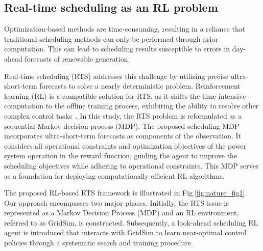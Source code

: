 \subsection*{Real-time scheduling as an RL problem}
Optimization-based methods are time-consuming, resulting in a reliance that traditional scheduling methods can only be performed through prior computation.
This can lead to scheduling results susceptible to errors in day-ahead forecasts of renewable generation. 

Real-time scheduling (RTS) addresses this challenge by utilizing precise ultra-short-term forecasts to solve a nearly deterministic problem. 
Reinforcement learning (RL) is a compatible solution for RTS, as it shifts the time-intensive computation to the offline training process, exhibiting the ability to resolve other complex control tasks~\cite{silver2016mastering,lillicrap2015continuous,schulman2017proximal,degrave2022magnetic,fawzi2022discovering,mandhane2022muzero}.
In this study, the RTS problem is reformulated as a sequential Markov decision process (MDP). 
The proposed scheduling MDP incorporates ultra-short-term forecasts as components of the observation. It considers all operational constraints and optimization objectives of the power system operation in the reward function, guiding the agent to improve the scheduling objectives while adhering to operational constraints. 
This MDP serves as a foundation for deploying computationally efficient RL algorithms.

The proposed RL-based RTS framework is illustrated in Fig.\ref{fig:nature_fig1}. Our approach encompasses two major phases. Initially, the RTS issue is represented as a Markov Decision Process (MDP) and an RL environment, referred to as GridSim, is constructed. Subsequently, a look-ahead scheduling RL agent is introduced that interacts with GridSim to learn near-optimal control policies through a systematic search and training procedure.

